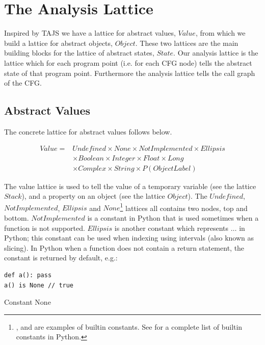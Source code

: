 \chapter{The Analysis Lattice}
Inspired by TAJS \cite{tajs} we have a lattice for abstract values, $Value$, from which we build a lattice for abstract objects, $Object$. These two lattices are the main building blocks for the lattice of abstract states, $State$. Our analysis lattice is the lattice which for each program point (i.e. for each CFG node) tells the abstract state of that program point. Furthermore the analysis lattice tells the call graph of the CFG.

\section{Abstract Values}
The concrete lattice for abstract values follows below.

\begin{eqnarray*}
Value = & Undefined \times None \times NotImplemented \times Ellipsis \\
        & \times Boolean \times Integer \times Float \times Long \\
        & \times Complex \times String \times P(ObjectLabel)
\end{eqnarray*}

The value lattice is used to tell the value of a temporary variable (see the lattice $Stack$), and a property on an object (see the lattice $Object$). The $Undefined$, $NotImplemented$, $Ellipsis$ and $None$\footnote{,  and  are examples of builtin constants. See \cite{pyref.constants} for a complete list of builtin constants in Python.} lattices all contains two nodes, top and bottom. $NotImplemented$ is a constant in Python that is used sometimes when a function is not supported. $Ellipsis$ is another constant which represents $\dots$ in Python; this constant can be used when indexing using intervals (also known as slicing). In Python when a function does not contain a return statement, the constant  is returned by default, e.g.:

\begin{listing}[H]
	\begin{verbatim}
def a(): pass
a() is None // true
	\end{verbatim}
	\caption{Constant None}\label{code:NoneExample}
\end{listing}

